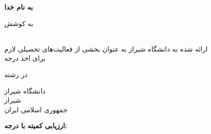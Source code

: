 {
    \centering
    \textbf{به نام خدا}

    \vspace{\baselineskip}
    \textbf{\PersianThesisTitle}

    \vspace{\baselineskip}
    به کوشش \\
    \textbf{\PersianStudentName}

    \vspace{\baselineskip}
    {\PersianThesisType} \\
    ارائه شده به دانشگاه شیراز به عنوان بخشی از فعالیت‌های تحصیلی لازم \\ برای اخذ درجه {\PersianDegree}

    \vspace{\baselineskip}
    در رشته \\
    {\PersianFieldOfStudy}

    \vspace{\baselineskip}
    دانشگاه شیراز \\
    شیراز \\
    جمهوری اسلامی ایران
    \par
}

\vspace{\baselineskip}
\textbf{ارزیابی کمیته {\PersianThesisType} با درجه: {\PersianThesisGrade}}

\PrintPersianSupervisors
\PrintPersianAdvisors
\ifx\PersianExternalExaminerList\empty\else\PrintPersianExternalExaminers\fi
\PrintPersianExaminers

\vspace{\baselineskip}
{
    \centering
    {\PersianThesisMonth} {\PersianThesisYear}
    \par
}
